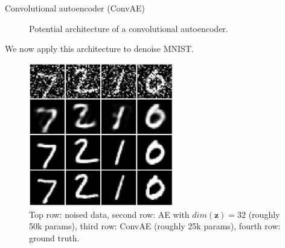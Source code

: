 \begin{vbframe}{Convolutional autoencoder (ConvAE)}
\begin{figure}
    \caption{Potential architecture of a convolutional autoencoder.}
  \end{figure}
  We now apply this architecture to denoise MNIST.
\framebreak
  \begin{figure}
    \centering
    \includegraphics[width=6.3cm]{plots/convolutional_autoencoder2.png}
    \caption{Top row: noised data, second row: AE with $dim(\pmb{z}) = 32$ (roughly 50k params), third row: ConvAE (roughly 25k params), fourth row: ground truth.}
  \end{figure}
\end{vbframe}


